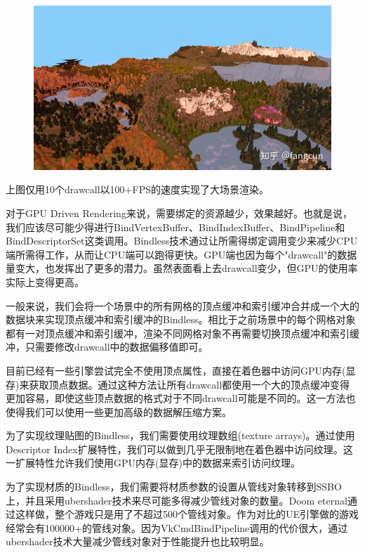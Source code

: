 \documentclass{ctexart}
\begin{document}
\begin{figure}[H]
	\centering
	\includegraphics[scale=0.4]{img/1-3.jpg}
\end{figure}

上图仅用10个drawcall以100+FPS的速度实现了大场景渲染。

对于GPU Driven Rendering来说，需要绑定的资源越少，效果越好。也就是说，我们应该尽可能少得进行BindVertexBuffer、BindIndexBuffer、BindPipeline和BindDescriptorSet这类调用。Bindless技术通过让所需得绑定调用变少来减少CPU端所需得工作，从而让CPU端可以跑得更快。GPU端也因为每个"drawcall"的数据量变大，也发挥出了更多的潜力。虽然表面看上去drawcall变少，但GPU的使用率实际上变得更高。

一般来说，我们会将一个场景中的所有网格的顶点缓冲和索引缓冲合并成一个大的数据块来实现顶点缓冲和索引缓冲的Bindless。相比于之前场景中的每个网格对象都有一对顶点缓冲和索引缓冲，渲染不同网格对象不再需要切换顶点缓冲和索引缓冲，只需要修改drawcall中的数据偏移值即可。

目前已经有一些引擎尝试完全不使用顶点属性，直接在着色器中访问GPU内存(显存)来获取顶点数据。通过这种方法让所有drawcall都使用一个大的顶点缓冲变得更加容易，即使这些顶点数据的格式对于不同drawcall可能是不同的。这一方法也使得我们可以使用一些更加高级的数据解压缩方案。

为了实现纹理贴图的Bindless，我们需要使用纹理数组(texture arrays)。通过使用Descriptor Index扩展特性，我们可以做到几乎无限制地在着色器中访问纹理。这一扩展特性允许我们使用GPU内存(显存)中的数据来索引访问纹理。

为了实现材质的Bindless，我们需要将材质参数的设置从管线对象转移到SSBO上，并且采用ubershader技术来尽可能多得减少管线对象的数量。Doom eternal通过这样做，整个游戏只是用了不超过500个管线对象。作为对比的UE引擎做的游戏经常会有100000+的管线对象。因为VkCmdBindPipeline调用的代价很大，通过ubershader技术大量减少管线对象对于性能提升也比较明显。
\end{document}
